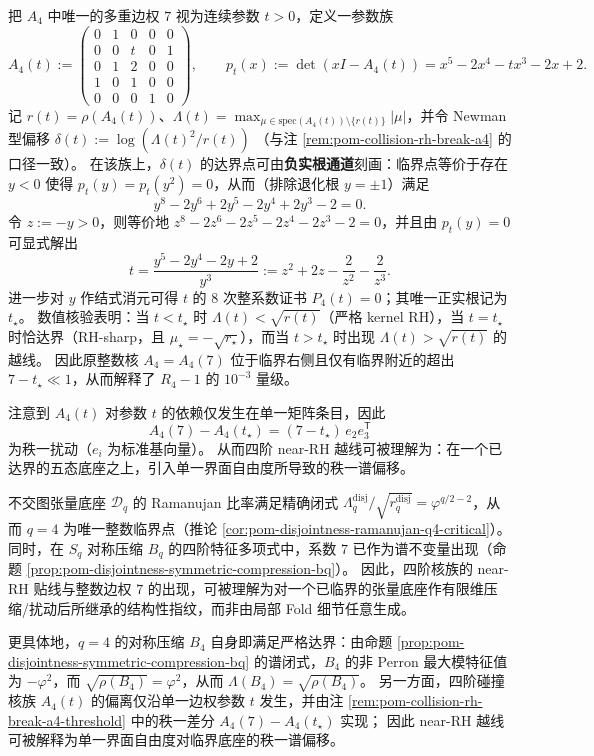 \begin{remark}\label{rem:pom-collision-rh-break-a4-threshold}
把 \(A_4\) 中唯一的多重边权 \(7\) 视为连续参数 \(t>0\)，定义一参数族
\[
A_4(t):=
\begin{pmatrix}
0&1&0&0&0\\
0&0&t&0&1\\
0&1&2&0&0\\
1&0&1&0&0\\
0&0&0&1&0
\end{pmatrix},
\qquad
p_t(x):=\det(xI-A_4(t))=x^5-2x^4-tx^3-2x+2.
\]
记 \(r(t)=\rho(A_4(t))\)、\(\Lambda(t)=\max_{\mu\in\mathrm{spec}(A_4(t))\setminus\{r(t)\}}|\mu|\)，并令 Newman 型偏移
\(
\delta(t):=\log(\Lambda(t)^2/r(t))
\)
（与注 \ref{rem:pom-collision-rh-break-a4} 的口径一致）。
在该族上，\(\delta(t)\) 的达界点可由\textbf{负实根通道}刻画：临界点等价于存在 \(y<0\) 使得 \(p_t(y)=p_t(y^2)=0\)，从而（排除退化根 \(y=\pm 1\)）满足
\[
y^8-2y^6+2y^5-2y^4+2y^3-2=0.
\]
令 \(z:=-y>0\)，则等价地
\(
z^8-2z^6-2z^5-2z^4-2z^3-2=0
\)，并且由 \(p_t(y)=0\) 可显式解出
\[
t=\frac{y^5-2y^4-2y+2}{y^3}
:=z^2+2z-\frac{2}{z^2}-\frac{2}{z^3}.
\]
进一步对 \(y\) 作结式消元可得 \(t\) 的 8 次整系数证书 \(P_4(t)=0\)；其唯一正实根记为 \(t_\star\)。
数值核验表明：当 \(t<t_\star\) 时 \(\Lambda(t)<\sqrt{r(t)}\)（严格 kernel RH），当 \(t=t_\star\) 时恰达界（RH-sharp，且 \(\mu_\star=-\sqrt{r_\star}\)），而当 \(t>t_\star\) 时出现 \(\Lambda(t)>\sqrt{r(t)}\) 的越线。
 因此原整数核 \(A_4=A_4(7)\) 位于临界右侧且仅有临界附近的超出 \(7-t_\star\ll 1\)，从而解释了 \(R_4-1\) 的 \(10^{-3}\) 量级。
\par
注意到 \(A_4(t)\) 对参数 \(t\) 的依赖仅发生在单一矩阵条目，因此
\[
A_4(7)-A_4(t_\star)=(7-t_\star)\,e_2e_3^{\mathsf T}
\]
为秩一扰动（\(e_i\) 为标准基向量）。
从而四阶 near-RH 越线可被理解为：在一个已达界的五态底座之上，引入单一界面自由度所导致的秩一谱偏移。
\end{remark}

\begin{remark}\label{rem:pom-q4-disjointness-base-critical}
不交图张量底座 \(\mathcal{D}_q\) 的 Ramanujan 比率满足精确闭式
\(
\Lambda_q^{\mathrm{disj}}/\sqrt{r_q^{\mathrm{disj}}}=\varphi^{q/2-2}
\)，从而 \(q=4\) 为唯一整数临界点（推论 \ref{cor:pom-disjointness-ramanujan-q4-critical}）。
同时，在 \(S_q\) 对称压缩 \(B_q\) 的四阶特征多项式中，系数 \(7\) 已作为谱不变量出现（命题 \ref{prop:pom-disjointness-symmetric-compression-bq}）。
因此，四阶核族的 near-RH 贴线与整数边权 \(7\) 的出现，可被理解为对一个已临界的张量底座作有限维压缩/扰动后所继承的结构性指纹，而非由局部 Fold 细节任意生成。
\par
更具体地，\(q=4\) 的对称压缩 \(B_4\) 自身即满足严格达界：由命题 \ref{prop:pom-disjointness-symmetric-compression-bq} 的谱闭式，\(B_4\) 的非 Perron 最大模特征值为 \(-\varphi^2\)，而 \(\sqrt{\rho(B_4)}=\varphi^2\)，从而 \(\Lambda(B_4)=\sqrt{\rho(B_4)}\)。
另一方面，四阶碰撞核族 \(A_4(t)\) 的偏离仅沿单一边权参数 \(t\) 发生，并由注 \ref{rem:pom-collision-rh-break-a4-threshold} 中的秩一差分 \(A_4(7)-A_4(t_\star)\) 实现；
因此 near-RH 越线可被解释为单一界面自由度对临界底座的秩一谱偏移。
\end{remark}

